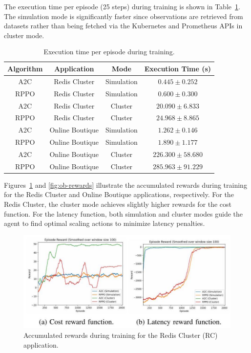 \documentclass[conference]{IEEEtran}
\begin{document}
The execution time per episode (25 steps) during training is shown in Table~\ref{tab:training-time}. The simulation mode is significantly faster since observations are retrieved from datasets rather than being fetched via the Kubernetes and Prometheus APIs in cluster mode.

\begin{table}[h]
    \centering
    \caption{Execution time per episode during training.}
    \label{tab:training-time}
    \begin{tabular}{|c|c|c|c|}
        \hline
        \textbf{Algorithm} & \textbf{Application} & \textbf{Mode} & \textbf{Execution Time (s)} \\
        \hline
        A2C & Redis Cluster & Simulation & $0.445 \pm 0.252$ \\
        RPPO & Redis Cluster & Simulation & $0.600 \pm 0.300$ \\
        A2C & Redis Cluster & Cluster & $20.090 \pm 6.833$ \\
        RPPO & Redis Cluster & Cluster & $24.968 \pm 8.865$ \\
        A2C & Online Boutique & Simulation & $1.262 \pm 0.146$ \\
        RPPO & Online Boutique & Simulation & $1.890 \pm 1.177$ \\
        A2C & Online Boutique & Cluster & $226.300 \pm 58.680$ \\
        RPPO & Online Boutique & Cluster & $285.963 \pm 91.229$ \\
        \hline
    \end{tabular}
\end{table}

Figures~\ref{fig:rc-rewards} and \ref{fig:ob-rewards} illustrate the accumulated rewards during training for the Redis Cluster and Online Boutique applications, respectively. For the Redis Cluster, the cluster mode achieves slightly higher rewards for the cost function. For the latency function, both simulation and cluster modes guide the agent to find optimal scaling actions to minimize latency penalties.

\begin{figure}[h]
    \centering
    \includegraphics[width=0.8\linewidth]{images/2024_11_17_21ad14b6196e5740bf69g-7}
    \caption{Accumulated rewards during training for the Redis Cluster (RC) application.}
    \label{fig:rc-rewards}
\end{figure}
\end{document}
